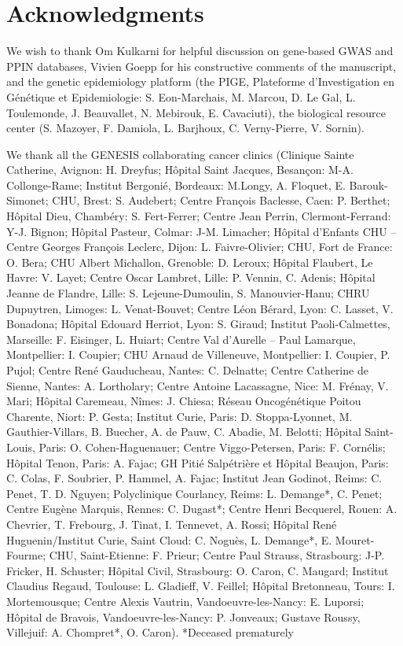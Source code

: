 \documentclass[10pt,letterpaper]{article}
\begin{document}
\section*{Acknowledgments}

We wish to thank Om Kulkarni for helpful discussion on gene-based GWAS and PPIN databases, Vivien Goepp for his constructive comments of the manuscript, and the genetic epidemiology platform (the PIGE, Plateforme d'Investigation en Génétique et Epidemiologie: S. Eon-Marchais, M. Marcou, D. Le Gal, L. Toulemonde, J. Beauvallet, N. Mebirouk, E. Cavaciuti), the biological resource center (S. Mazoyer, F. Damiola, L. Barjhoux, C. Verny-Pierre, V. Sornin).

We thank all the GENESIS collaborating cancer clinics (Clinique Sainte Catherine, Avignon: H. Dreyfus; Hôpital Saint Jacques, Besançon: M-A. Collonge-Rame; Institut Bergonié, Bordeaux: M.Longy, A. Floquet, E. Barouk-Simonet; CHU, Brest: S. Audebert; Centre François Baclesse, Caen: P. Berthet; Hôpital Dieu, Chambéry: S. Fert-Ferrer; Centre Jean Perrin, Clermont-Ferrand: Y-J. Bignon; Hôpital Pasteur, Colmar: J-M. Limacher; Hôpital d’Enfants CHU – Centre Georges François Leclerc, Dijon: L. Faivre-Olivier; CHU, Fort de France: O. Bera; CHU Albert Michallon, Grenoble: D. Leroux; Hôpital Flaubert, Le Havre: V. Layet; Centre Oscar Lambret, Lille: P. Vennin, C. Adenis; Hôpital Jeanne de Flandre, Lille: S. Lejeune-Dumoulin, S. Manouvier-Hanu; CHRU Dupuytren, Limoges: L. Venat-Bouvet; Centre Léon Bérard, Lyon: C. Lasset, V. Bonadona; Hôpital Edouard Herriot, Lyon: S. Giraud; Institut Paoli-Calmettes, Marseille: F. Eisinger, L. Huiart; Centre Val d’Aurelle – Paul Lamarque, Montpellier: I. Coupier; CHU Arnaud de Villeneuve, Montpellier: I. Coupier, P. Pujol; Centre René Gauducheau, Nantes: C. Delnatte; Centre Catherine de Sienne, Nantes: A. Lortholary; Centre Antoine Lacassagne, Nice: M. Frénay, V. Mari; Hôpital Caremeau, Nîmes: J. Chiesa; Réseau Oncogénétique Poitou Charente, Niort: P. Gesta; Institut Curie, Paris: D. Stoppa-Lyonnet, M. Gauthier-Villars, B. Buecher, A. de Pauw, C. Abadie, M. Belotti; Hôpital Saint-Louis, Paris: O. Cohen-Haguenauer; Centre Viggo-Petersen, Paris: F. Cornélis; Hôpital Tenon, Paris: A. Fajac; GH Pitié Salpétrière et Hôpital Beaujon, Paris: C. Colas, F. Soubrier, P. Hammel, A. Fajac; Institut Jean Godinot, Reims: C. Penet, T. D. Nguyen; Polyclinique Courlancy, Reims: L. Demange*, C. Penet; Centre Eugène Marquis, Rennes: C. Dugast*; Centre Henri Becquerel, Rouen: A. Chevrier, T. Frebourg, J. Tinat, I. Tennevet, A. Rossi; Hôpital René Huguenin/Institut Curie, Saint Cloud: C. Noguès, L. Demange*, E. Mouret-Fourme; CHU, Saint-Etienne: F. Prieur; Centre Paul Strauss, Strasbourg: J-P. Fricker, H. Schuster; Hôpital Civil, Strasbourg: O. Caron, C. Maugard; Institut Claudius Regaud, Toulouse: L. Gladieff, V. Feillel; Hôpital Bretonneau, Tours: I. Mortemousque; Centre Alexis Vautrin, Vandoeuvre-les-Nancy: E. Luporsi; Hôpital de Bravois, Vandoeuvre-les-Nancy: P. Jonveaux; Gustave Roussy, Villejuif: A. Chompret*, O. Caron).
*Deceased prematurely
\end{document}
